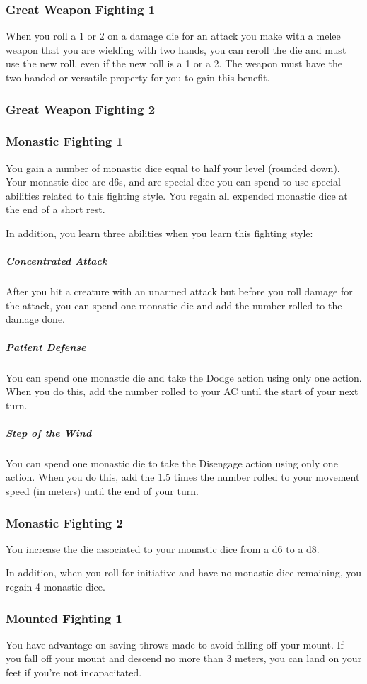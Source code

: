 \subsubsection{Great Weapon Fighting 1}
    When you roll a 1 or 2 on a damage die for an attack you make with a melee weapon that you are wielding with two hands, you can reroll the die and must use the new roll, even if the new roll is a 1 or a 2.
    The weapon must have the two-handed or versatile property for you to gain this benefit.
\subsubsection{Great Weapon Fighting 2}
\subsubsection{Monastic Fighting 1}
    You gain a number of monastic dice equal to half your level (rounded down).
    Your monastic dice are d6s, and are special dice you can spend to use special abilities related to this fighting style.
    You regain all expended monastic dice at the end of a short rest.

    In addition, you learn three abilities when you learn this fighting style:
    \subparagraph{Concentrated Attack} After you hit a creature with an unarmed attack but before you roll damage for the attack, you can spend one monastic die and add the number rolled to the damage done.
    \subparagraph{Patient Defense} You can spend one monastic die and take the Dodge action using only one action.
    When you do this, add the number rolled to your AC until the start of your next turn.
    \subparagraph{Step of the Wind} You can spend one monastic die to take the Disengage action using only one action.
    When you do this, add the 1.5 times the number rolled to your movement speed (in meters) until the end of your turn.
\subsubsection{Monastic Fighting 2}
    You increase the die associated to your monastic dice from a d6 to a d8.

    In addition, when you roll for initiative and have no monastic dice remaining, you regain 4 monastic dice.
\subsubsection{Mounted Fighting 1}
    You have advantage on saving throws made to avoid falling off your mount.
    If you fall off your mount and descend no more than 3 meters, you can land on your feet if you're not incapacitated.

